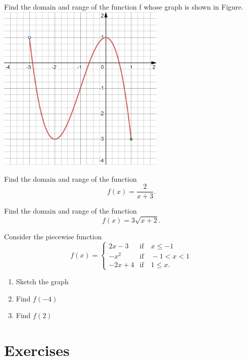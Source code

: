 \begin{example}
  Find the domain and range of the function f whose graph is shown in Figure.
  \includegraphics[width=0.6\textwidth]{figs/FindDomainRangeCubic.png}
\end{example}
\vspace*{-8\baselineskip}

\begin{example}
  Find the domain and range of the function
  $$f(x)=\frac{2}{x+3}.$$
\end{example}

\newpage

\begin{example}
  Find the domain and range of the function
  $$f(x)=3\sqrt{x+2}.$$
\end{example}


\begin{example}
  Consider the piecewise function
  $$
  f(x)=\begin{cases}
    2x-3 & \text{if}\quad x\le -1\\
    -x^2 & \text{if}\quad -1<x< 1\\
    -2x+4 & \text{if}\quad 1\le x.
  \end{cases}
  $$
  \begin{enumerate}[threecol]
    \item Sketch the graph
    \item Find $f(-4)$
    \item Find $f(2)$
  \end{enumerate}
\end{example}

\newpage

\section*{Exercises}

